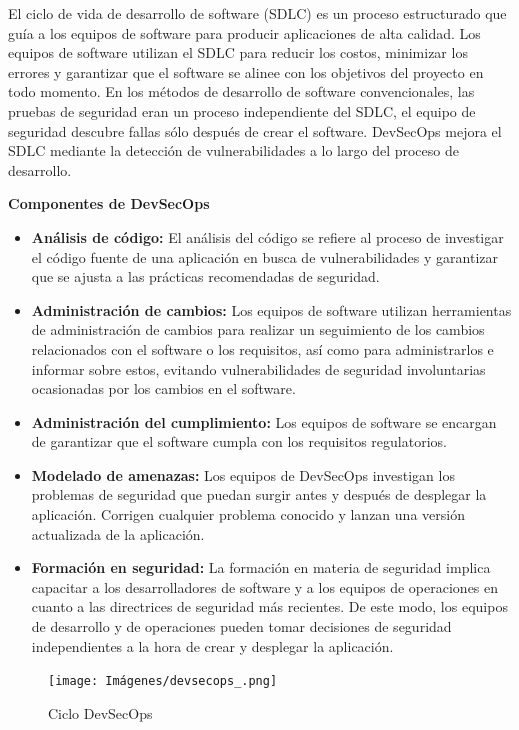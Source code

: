 El ciclo de vida de desarrollo de software (SDLC) es un proceso estructurado que guía a los equipos de software para producir aplicaciones de alta calidad. Los equipos de software utilizan el SDLC para reducir los costos, minimizar los errores y garantizar que el software se alinee con los objetivos del proyecto en todo momento. En los métodos de desarrollo de software convencionales, las pruebas de seguridad eran un proceso independiente del SDLC, el equipo de seguridad descubre fallas sólo después de crear el software. DevSecOps mejora el SDLC mediante la detección de vulnerabilidades a lo largo del proceso de desarrollo.

\vspace{1cm}

\textbf{Componentes de DevSecOps}

\begin{itemize}
    \item \textbf{Análisis de código:} El análisis del código se refiere al proceso de investigar el código fuente de una aplicación en busca de vulnerabilidades y garantizar que se ajusta a las prácticas recomendadas de seguridad.
    \item \textbf{Administración de cambios:} Los equipos de software utilizan herramientas de administración de cambios para realizar un seguimiento de los cambios relacionados con el software o los requisitos, así como para administrarlos e informar sobre estos, evitando vulnerabilidades de seguridad involuntarias ocasionadas por los cambios en el software.
    \item \textbf{Administración del cumplimiento:} Los equipos de software se encargan de garantizar que el software cumpla con los requisitos regulatorios.
    \item \textbf{Modelado de amenazas:} Los equipos de DevSecOps investigan los problemas de seguridad que puedan surgir antes y después de desplegar la aplicación. Corrigen cualquier problema conocido y lanzan una versión actualizada de la aplicación.
    \item \textbf{Formación en seguridad:} La formación en materia de seguridad implica capacitar a los desarrolladores de software y a los equipos de operaciones en cuanto a las directrices de seguridad más recientes. De este modo, los equipos de desarrollo y de operaciones pueden tomar decisiones de seguridad independientes a la hora de crear y desplegar la aplicación.
\end{itemize}

\begin{figure}[ht]
    \centering
    \texttt{[image: Imágenes/devsecops\_.png]}
    \caption{Ciclo DevSecOps}
    \label{fig:enter-label}
\end{figure}

